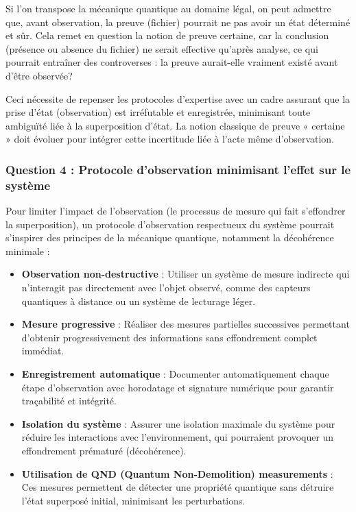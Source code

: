 \documentclass[12pt, a4paper]{article}
\begin{document}
		Si l'on transpose la mécanique quantique au domaine légal, on peut admettre que, avant observation, la preuve (fichier) pourrait ne pas avoir un état déterminé et sûr. Cela remet en question la notion de preuve certaine, car la conclusion (présence ou absence du fichier) ne serait effective qu'après analyse, ce qui pourrait entraîner des controverses : la preuve aurait-elle vraiment existé avant d'être observée?
		
		Ceci nécessite de repenser les protocoles d'expertise avec un cadre assurant que la prise d'état (observation) est irréfutable et enregistrée, minimisant toute ambiguïté liée à la superposition d'état. La notion classique de preuve « certaine » doit évoluer pour intégrer cette incertitude liée à l'acte même d'observation.
		
		\subsubsection*{Question 4 : Protocole d'observation minimisant l'effet sur le système}
		
		Pour limiter l'impact de l'observation (le processus de mesure qui fait s'effondrer la superposition), un protocole d'observation respectueux du système pourrait s'inspirer des principes de la mécanique quantique, notamment la décohérence minimale :
		
		\begin{itemize}
			\item \textbf{Observation non-destructive} : Utiliser un système de mesure indirecte qui n'interagit pas directement avec l'objet observé, comme des capteurs quantiques à distance ou un système de lecturage léger.
			\item \textbf{Mesure progressive} : Réaliser des mesures partielles successives permettant d'obtenir progressivement des informations sans effondrement complet immédiat.
			\item \textbf{Enregistrement automatique} : Documenter automatiquement chaque étape d'observation avec horodatage et signature numérique pour garantir traçabilité et intégrité.
			\item \textbf{Isolation du système} : Assurer une isolation maximale du système pour réduire les interactions avec l'environnement, qui pourraient provoquer un effondrement prématuré (décohérence).
			\item \textbf{Utilisation de QND (Quantum Non-Demolition) measurements} : Ces mesures permettent de détecter une propriété quantique sans détruire l'état superposé initial, minimisant les perturbations.
		\end{itemize}
		
\end{document}
